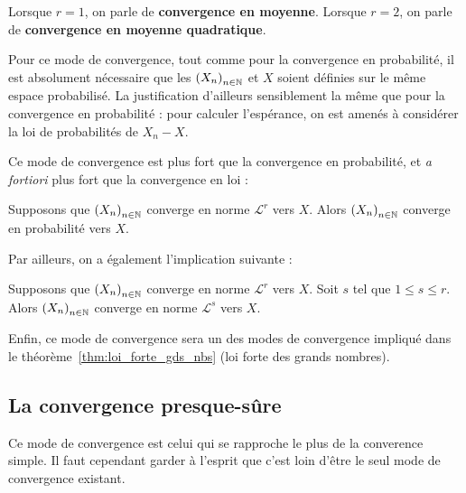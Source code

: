 \documentclass[../integ-proba.tex]{subfiles}
\begin{document}
    \begin{rem}
        Lorsque $r=1$, on parle de \textbf{convergence en moyenne}.
        Lorsque $r=2$, on parle de \textbf{convergence en moyenne quadratique}.
    \end{rem}

    \begin{rem}
        Pour ce mode de convergence, tout comme pour la convergence en probabilité, il est absolument nécessaire que les $\left(X_n\right)_{n\in\mathbb{N}}$ et $X$ soient définies sur le même espace probabilisé.
        La justification d'ailleurs sensiblement la même que pour la convergence en probabilité : pour calculer l'espérance, on est amenés à considérer la loi de probabilités de $X_n - X$.
    \end{rem}

    Ce mode de convergence est plus fort que la convergence en probabilité, et \textit{a fortiori} plus fort que la convergence en loi :

    \begin{prop}
        Supposons que $\left(X_n\right)_{n\in\mathbb{N}}$ converge en norme $\mathcal{L}^r$ vers $X$.
        Alors $\left(X_n\right)_{n\in\mathbb{N}}$ converge en probabilité vers $X$.
    \end{prop}

    Par ailleurs, on a également l'implication suivante :

    \begin{prop}
        Supposons que $\left(X_n\right)_{n\in\mathbb{N}}$ converge en norme $\mathcal{L}^r$ vers $X$.
        Soit $s$ tel que $1 \leq s \leq r$.
        Alors $\left(X_n\right)_{n\in\mathbb{N}}$ converge en norme $\mathcal{L}^s$ vers $X$.
    \end{prop}

    \begin{rem}
        Enfin, ce mode de convergence sera un des modes de convergence impliqué dans le théorème~\ref{thm:loi_forte_gds_nbs} (loi forte des grands nombres).
    \end{rem}

    \subsection{La convergence presque-sûre}

    Ce mode de convergence est celui qui se rapproche le plus de la converence simple.
    Il faut cependant garder à l'esprit que c'est loin d'être le seul mode de convergence existant.
\end{document}
